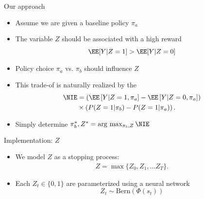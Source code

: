 \begin{frame}{Our approach}
	\begin{itemize}
\item Assume we are given a baseline policy $\pi_a$ \pause
\item The variable $Z$ should be associated with a high reward 
$$
\EE[Y | Z=1] > \EE[Y | Z=0]
$$ \pause
\item Policy choice $\pi_a$ vs. $\pi_b$ should influence $Z$ \pause
\item This trade-of is naturally realized by the ~\citep{pearl2001direct}
\begin{align*}
	\NIE & = \left( \EE\left[Y | Z=1, \pi_a \right] - \EE\left[Y | Z=0, \pi_a \right] \right)  \\  
	& \times  \left( P(Z=1| \pi_b) -P(Z=1| \pi_a) \right).%
\end{align*} \pause
\item Simply determine $\pi_b^*, Z^* = \arg\,\max_{\pi_b, Z} \NIE$
	\end{itemize}
\end{frame}

\begin{frame}{Implementation: $Z$}
\begin{itemize}
\item We model $Z$ as a stopping process:
\begin{align*}
	Z = \max\{Z_0, Z_1, \dots Z_T\}.
\end{align*}	
\item Each $Z_t \in \{0,1\}$ are parameterized using a neural network
$$
Z_t \sim \textrm{Bern}(\Phi(s_t))
$$
\end{itemize}
\end{frame}

